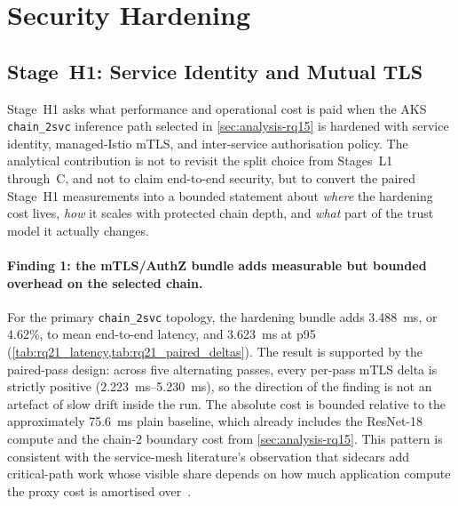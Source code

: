 \section{Security Hardening}
\label{sec:analysis-security}

\subsection{Stage~H1: Service Identity and Mutual TLS}
\label{sec:analysis-rq21}

Stage~H1 asks what performance and operational cost is paid when the AKS
\texttt{chain\_2svc} inference path selected in \cref{sec:analysis-rq15} is
hardened with service identity, managed-Istio mTLS, and inter-service
authorisation policy. The analytical contribution is not to revisit the split
choice from Stages~L1 through~C, and not to claim end-to-end security, but to
convert the paired Stage~H1 measurements into a bounded statement about
\emph{where} the hardening cost lives, \emph{how} it scales with protected
chain depth, and \emph{what} part of the trust model it actually changes.

\paragraph{Finding 1: the mTLS/AuthZ bundle adds measurable but bounded
overhead on the selected chain.}
For the primary \texttt{chain\_2svc} topology, the hardening bundle adds
3.488~ms, or 4.62\%, to mean end-to-end latency, and 3.623~ms at p95
(\cref{tab:rq21_latency,tab:rq21_paired_deltas}). The result is supported by
the paired-pass design: across five alternating passes, every per-pass mTLS
delta is strictly positive (2.223~ms--5.230~ms), so the direction of the
finding is not an artefact of slow drift inside the run. The absolute cost is
bounded relative to the approximately 75.6~ms plain baseline, which already
includes the ResNet-18 compute and the chain-2 boundary cost from
\cref{sec:analysis-rq15}. This pattern is consistent with the service-mesh
literature's observation that sidecars add critical-path work whose visible
share depends on how much application compute the proxy cost is amortised
over~\cite{meshinsight_socc23}.

